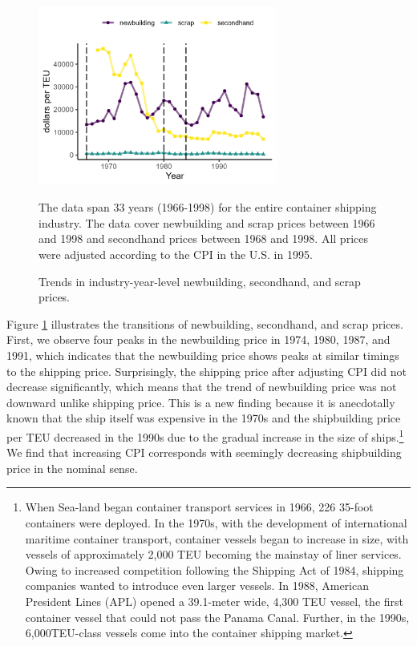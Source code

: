 \documentclass[11pt]{article}
\begin{document}
\begin{figure}[!ht]
\begin{center}
\includegraphics[width = 0.7\textwidth]{figuretable/price_newbuilding_secondhand_scrap.png}
\caption{Trends in industry-year-level newbuilding, secondhand, and scrap prices.}
\label{fg:price_newbuilding_secondhand_scrap}
\end{center}
\footnotesize
The data span 33 years (1966-1998) for the entire container shipping industry. The data cover newbuilding and scrap prices between 1966 and 1998 and secondhand prices between 1968 and 1998. All prices were adjusted according to the CPI in the U.S. in 1995. 
\end{figure}

Figure \ref{fg:price_newbuilding_secondhand_scrap} illustrates the transitions of newbuilding, secondhand, and scrap prices. First, we observe four peaks in the newbuilding price in 1974, 1980, 1987, and 1991, which indicates that the newbuilding price shows peaks at similar timings to the shipping price. Surprisingly, the shipping price after adjusting CPI did not decrease significantly, which means that the trend of newbuilding price was not downward unlike shipping price. This is a new finding because it is anecdotally known that the ship itself was expensive in the 1970s and the shipbuilding price per TEU decreased in the 1990s due to the gradual increase in the size of ships.\footnote{When Sea-land began container transport services in 1966, 226 35-foot containers were deployed. In the 1970s, with the development of international maritime container transport, container vessels began to increase in size, with vessels of approximately 2,000 TEU becoming the mainstay of liner services. Owing to increased competition following the Shipping Act of 1984, shipping companies wanted to introduce even larger vessels. In 1988, American President Lines (APL) opened a 39.1-meter wide, 4,300 TEU vessel, the first container vessel that could not pass the Panama Canal. Further, in the 1990s, 6,000TEU-class vessels come into the container shipping market.} We find that increasing CPI corresponds with seemingly decreasing shipbuilding price in the nominal sense. 
\end{document}
